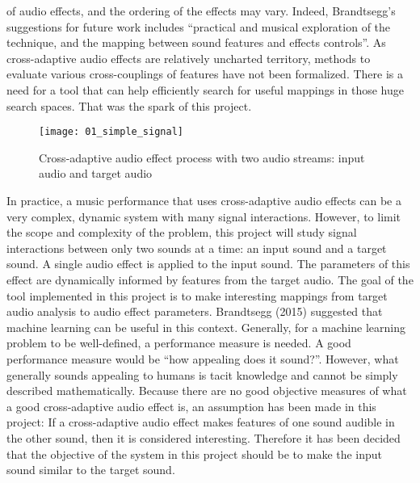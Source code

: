 of audio effects, and the ordering of the effects may vary. Indeed, Brandtsegg’s suggestions for future work includes “practical and musical exploration of the technique, and the mapping between sound features and effects controls”. As cross-adaptive audio effects are relatively uncharted territory, methods to evaluate various cross-couplings of features have not been formalized. There is a need for a tool that can help efficiently search for useful mappings in those huge search spaces. That was the spark of this project.

\begin{figure}[h]
    \centering
    \texttt{[image: 01\_simple\_signal]}
    \caption{Cross-adaptive audio effect process with two audio streams: input audio and target audio}
    \label{fig:mesh1}
\end{figure}

In practice, a music performance that uses cross-adaptive audio effects can be a very complex, dynamic system with many signal interactions. However, to limit the scope and complexity of the problem, this project will study signal interactions between only two sounds at a time: an input sound and a target sound. A single audio effect is applied to the input sound. The parameters of this effect are dynamically informed by features from the target audio. The goal of the tool implemented in this project is to make interesting mappings from target audio analysis to audio effect parameters. Brandtsegg (2015) suggested that machine learning can be useful in this context. Generally, for a machine learning problem to be well-defined, a performance measure is needed. A good performance measure would be “how appealing does it sound?”. However, what generally sounds appealing to humans is tacit knowledge and cannot be simply described mathematically. Because there are no good objective measures of what a good cross-adaptive audio effect is, an assumption has been made in this project: If a cross-adaptive audio effect makes features of one sound audible in the other sound, then it is considered interesting. Therefore it has been decided that the objective of the system in this project should be to make the input sound similar to the target sound.

